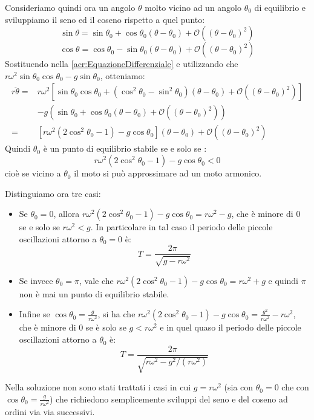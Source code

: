 \documentclass[../main.tex]{subfiles}
\begin{document}
Consideriamo quindi ora un angolo $\theta$ molto vicino ad un angolo $\theta_0$ di equilibrio e sviluppiamo il seno ed 
il coseno rispetto a quel punto:
\begin{equation}\label{acr:SviluppoSeno}
	\sin\theta=\sin\theta_0+\cos\theta_0(\theta-\theta_0)+\mathcal{O}((\theta-\theta_0)^2)
\end{equation}
\begin{equation}\label{acr:SviluppoCoseno}
	\cos\theta=\cos\theta_0-\sin\theta_0(\theta-\theta_0)+\mathcal{O}((\theta-\theta_0)^2)
\end{equation}
Sostituendo nella \cref{acr:EquazioneDifferenziale} e utilizzando che $r\omega^2\sin\theta_0\cos\theta_0-g\sin\theta_0$, 
otteniamo:
\begin{equation*}
\begin{split}
	r\ddot{\theta}	=& r\omega^2\left[\sin\theta_0\cos\theta_0+\left(\cos^2\theta_0-\sin^2\theta_0\right)
					(\theta-\theta_0)+\mathcal{O}((\theta-\theta_0)^2)\right]\\
					& -g\left(\sin\theta_0+\cos\theta_0(\theta-\theta_0)+\mathcal{O}((\theta-\theta_0)^2)\right)\\
					=& \left[ r\omega^2\left(2\cos^2\theta_0-1\right)-g\cos\theta_0 \right](\theta-\theta_0)
					+\mathcal{O}((\theta-\theta_0)^2)
\end{split}
\end{equation*}
Quindi $\theta_0$ è un punto di equilibrio stabile se e solo se :
\begin{equation}\label{}
	r\omega^2\left(2\cos^2\theta_0-1\right)-g\cos\theta_0<0
\end{equation}
cioè se vicino a $\theta_0$ il moto si può approssimare ad un moto armonico.

Distinguiamo ora tre casi:
\begin{itemize}
	\item 	Se $\theta_0=0$, allora $r\omega^2\left(2\cos^2\theta_0-1\right)-g\cos\theta_0=r\omega^2-g$,
			che è minore di 0 se e solo se $r\omega^2<g$. In particolare in tal caso il periodo delle piccole
			oscillazioni attorno a $\theta_0=0$ è:
			\begin{equation*}
				T=\frac{2\pi}{\sqrt{g-r\omega^2}}
			\end{equation*}
	\item	Se invece $\theta_0=\pi$, vale che 
			$r\omega^2\left(2\cos^2\theta_0-1\right)-g\cos\theta_0=r\omega^2+g$ e quindi $\pi$
			non è mai un punto di equilibrio stabile.
	\item	Infine se $\cos\theta_0=\frac{g}{r\omega^2}$, si ha che
			$r\omega^2\left(2\cos^2\theta_0-1\right)-g\cos\theta_0=\frac{g^2}{r\omega^2}-r\omega^2$, che
			è minore di 0 se è solo se $g<r\omega^2$ e in quel quaso il periodo delle piccole oscillazioni
			attorno a $\theta_0$ è:
			\begin{equation*}
				T=\frac{2\pi}{\sqrt{r\omega^2-g^2/(r\omega^2)}}
			\end{equation*}
\end{itemize}

Nella soluzione non sono stati trattati i casi in cui $g=r\omega^2$ 
(sia con $\theta_0=0$ che con $\cos\theta_0=\frac{g}{r\omega^2}$) che richiedono semplicemente
sviluppi del seno e del coseno ad ordini via via successivi.
\end{document}
